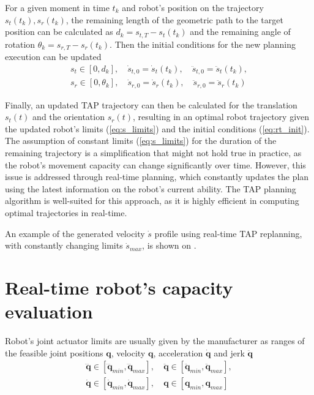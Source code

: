For a given moment in time $t_k$ and robot's position on the trajectory $s_t(t_k),s_r(t_k)$, the remaining length of the 
geometric path to the target position can be calculated as $d_k = s_{t,T} - s_t(t_k)$ and the remaining angle of rotation $\theta_k\!=\!s_{r,T}\! - \!s_r(t_k)$. Then the initial conditions for the new planning execution can be updated 
\begin{equation}
\begin{split}
    s_t \in [0, d_k], \quad \dot{s}_{t,0} = \dot{s}_t(t_k), \quad \ddot{s}_{t,0} = \ddot{s}_t(t_k),\\ 
    s_r \in [0 , \theta_k], \quad \dot{s}_{r,0} = \dot{s}_r(t_k), \quad \ddot{s}_{r,0} = \ddot{s}_r(t_k)
\end{split}\label{eq:rt_init}
\end{equation}

Finally, an updated TAP trajectory can then be calculated for the translation $s_t(t)$ and the orientation $s_r(t)$, resulting in an optimal robot trajectory given the updated robot's limits (\ref{eq:s_limits}) and the initial conditions (\ref{eq:rt_init}). 
The assumption of constant limits (\ref{eq:s_limits}) for the duration of the remaining trajectory is a simplification that might not hold true in practice, as the robot's movement capacity can change significantly over time. However, this issue is addressed through real-time planning, which constantly updates the plan using the latest information on the robot's current ability. The TAP planning algorithm is well-suited for this approach, as it is highly efficient in computing optimal trajectories in real-time. 

An example of the generated velocity $\dot{s}$ profile using real-time TAP replanning, with constantly changing limits $\dot{s}_{max}$, is shown on . 

\section{Real-time robot's capacity evaluation}
\label{ch:capacity}

Robot's joint actuator limits are usually given by the manufacturer as ranges of the feasible joint positions $\bm{q}$, velocity $\bm{q}$, acceleration $\dot{\bm{q}}$ and jerk $\ddot{\bm{q}}$
\begin{equation}
\begin{split}
\dddot{\bm{q}} \in [ \dddot{\bm{q}}_{min}, \dddot{\bm{q}}_{max}] ,&~\ddot{\bm{q}} \in [\ddot{\bm{q}}_{min},  \ddot{\bm{q}}_{max}],\\ 
\dot{\bm{q}} \in [\dot{\bm{q}}_{min},  \dot{\bm{q}}_{max}],&~{\bm{q}} \in [{\bm{q}}_{min},  {\bm{q}}_{max}]
\end{split}
\label{eq:kin_limits}
\end{equation}

